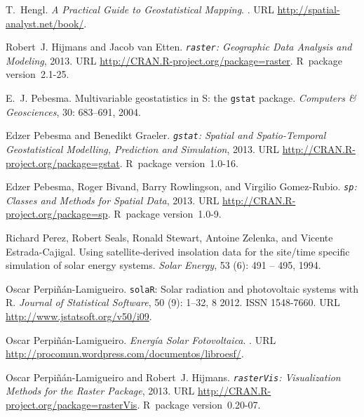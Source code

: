 \documentclass[11pt, english]{article}
\begin{document}
\begin{thebibliography}{20}
T.~Hengl.
\newblock \emph{A Practical Guide to Geostatistical Mapping}.
.
\newblock URL \url{http://spatial-analyst.net/book/}.

Robert~J. Hijmans and Jacob van Etten.
\newblock \emph{\texttt{raster}: Geographic Data Analysis and Modeling}, 2013.
\newblock URL \url{http://CRAN.R-project.org/package=raster}.
\newblock R~package version~2.1-25.

E.~J. Pebesma.
\newblock Multivariable geostatistics in {S}: the \texttt{gstat} package.
\newblock \emph{Computers \& Geosciences}, 30: 683--691, 2004.

Edzer Pebesma and Benedikt Graeler.
\newblock \emph{\texttt{gstat}: Spatial and Spatio-Temporal Geostatistical
  Modelling, Prediction and Simulation}, 2013.
\newblock URL \url{http://CRAN.R-project.org/package=gstat}.
\newblock R~package version~1.0-16.

Edzer Pebesma, Roger Bivand, Barry Rowlingson, and Virgilio Gomez-Rubio.
\newblock \emph{\texttt{sp}: Classes and Methods for Spatial Data}, 2013.
\newblock URL \url{http://CRAN.R-project.org/package=sp}.
\newblock R~package version~1.0-9.

Richard Perez, Robert Seals, Ronald Stewart, Antoine Zelenka, and Vicente
  Estrada-Cajigal.
\newblock Using satellite-derived insolation data for the site/time specific
  simulation of solar energy systems.
\newblock \emph{Solar Energy}, 53 (6): 491 -- 495, 1994.

Oscar Perpiñán-Lamigueiro.
\newblock \texttt{solaR}: Solar radiation and photovoltaic systems with {R}.
\newblock \emph{Journal of Statistical Software}, 50 (9):
  1--32, 8 2012.
\newblock ISSN 1548-7660.
\newblock URL \url{http://www.jstatsoft.org/v50/i09}.

Oscar Perpiñán-Lamigueiro.
\newblock \emph{Energía Solar Fotovoltaica}.
.
\newblock URL \url{http://procomun.wordpress.com/documentos/libroesf/}.

Oscar Perpiñán-Lamigueiro and Robert~J. Hijmans.
\newblock \emph{\texttt{rasterVis}: Visualization Methods for the Raster
  Package}, 2013.
\newblock URL \url{http://CRAN.R-project.org/package=rasterVis}.
\newblock R~package version~0.20-07.


\end{thebibliography}
\end{document}
